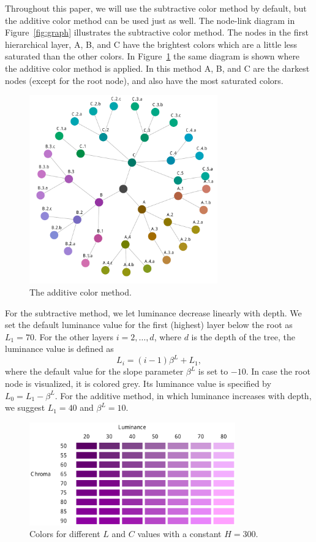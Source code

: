 \documentclass[journal]{vgtc}                %
\begin{document}
Throughout this paper, we will use the subtractive color method by default, but the additive color method can be used just as well. The node-link diagram in Figure~\ref{fig:graph} illustrates the subtractive color method. The nodes in the first hierarchical layer, A, B, and C have the brightest colors which are a little less saturated than the other colors. In Figure~\ref{fig:graphadd} the same diagram is shown where the additive color method is applied. In this method A, B, and C are the darkest nodes (except for the root node), and also have the most saturated colors.

\begin{figure}[tb]
  \centering
  \includegraphics[width=3.2in]{HCPgraph3.pdf}
  \caption{The additive color method.}\label{fig:graphadd}
\end{figure}


For the subtractive method, we let luminance decrease linearly with depth. We set the default luminance value for the first (highest) layer below the root as $L_1=70$. For the other layers $i=2,\ldots, d$, where $d$ is the depth of the tree, the luminance value is defined as
\begin{equation}
L_i=(i-1)\beta^L + L_1,
\end{equation}
where the default value for the slope parameter $\beta^L$ is set to $-10$. In case the root node is visualized, it is colored grey. Its luminance value is specified by $L_0=L_1-\beta^L$. For the additive method, in which luminance increases with depth, we suggest $L_1=40$ and $\beta^L=10$. 

\begin{figure}[tb]
  \centering
  \includegraphics[width=3.5in]{LC.pdf}
  \caption{Colors for different $L$ and $C$ values with a constant $H=300$.}\label{fig:lc}
\end{figure}
\end{document}
